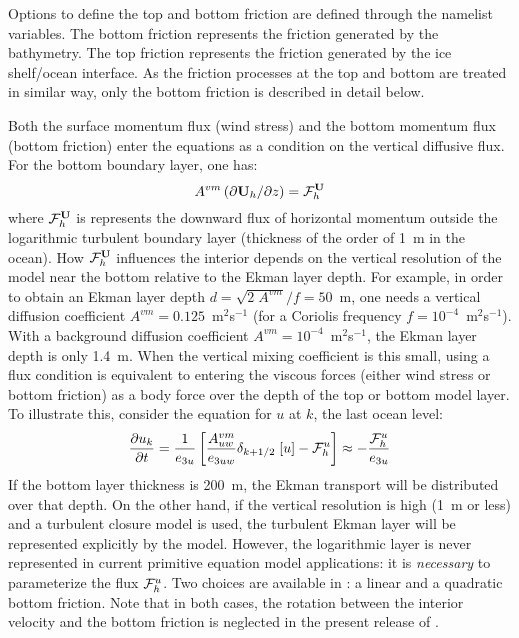 \documentclass[../tex_main/NEMO_manual]{subfiles}
\begin{document}
Options to define the top and bottom friction are defined through the   namelist variables.
The bottom friction represents the friction generated by the bathymetry. 
The top friction represents the friction generated by the ice shelf/ocean interface. 
As the friction processes at the top and bottom are treated in similar way, 
only the bottom friction is described in detail below.


Both the surface momentum flux (wind stress) and the bottom momentum 
flux (bottom friction) enter the equations as a condition on the vertical 
diffusive flux. For the bottom boundary layer, one has:
\begin{equation} \label{eq:zdfbfr_flux}
A^{vm} \left( \partial {\textbf U}_h / \partial z \right) = {{\cal F}}_h^{\textbf U}
\end{equation}
where ${\cal F}_h^{\textbf U}$ is represents the downward flux of horizontal momentum 
outside the logarithmic turbulent boundary layer (thickness of the order of 
1~m in the ocean). How ${\cal F}_h^{\textbf U}$ influences the interior depends on the 
vertical resolution of the model near the bottom relative to the Ekman layer 
depth. For example, in order to obtain an Ekman layer depth 
$d = \sqrt{2\;A^{vm}} / f = 50$~m, one needs a vertical diffusion coefficient 
$A^{vm} = 0.125$~m$^2$s$^{-1}$ (for a Coriolis frequency 
$f = 10^{-4}$~m$^2$s$^{-1}$). With a background diffusion coefficient 
$A^{vm} = 10^{-4}$~m$^2$s$^{-1}$, the Ekman layer depth is only 1.4~m. 
When the vertical mixing coefficient is this small, using a flux condition is 
equivalent to entering the viscous forces (either wind stress or bottom friction) 
as a body force over the depth of the top or bottom model layer. To illustrate 
this, consider the equation for $u$ at $k$, the last ocean level:
\begin{equation} \label{eq:zdfbfr_flux2}
\frac{\partial u_k}{\partial t} = \frac{1}{e_{3u}} \left[ \frac{A_{uw}^{vm}}{e_{3uw}} \delta_{k+1/2}\;[u] - {\cal F}^u_h \right] \approx - \frac{{\cal F}^u_{h}}{e_{3u}}
\end{equation}
If the bottom layer thickness is 200~m, the Ekman transport will 
be distributed over that depth. On the other hand, if the vertical resolution 
is high (1~m or less) and a turbulent closure model is used, the turbulent 
Ekman layer will be represented explicitly by the model. However, the 
logarithmic layer is never represented in current primitive equation model 
applications: it is \emph{necessary} to parameterize the flux ${\cal F}^u_h $. 
Two choices are available in \NEMO: a linear and a quadratic bottom friction. 
Note that in both cases, the rotation between the interior velocity and the 
bottom friction is neglected in the present release of \NEMO.
\end{document}
